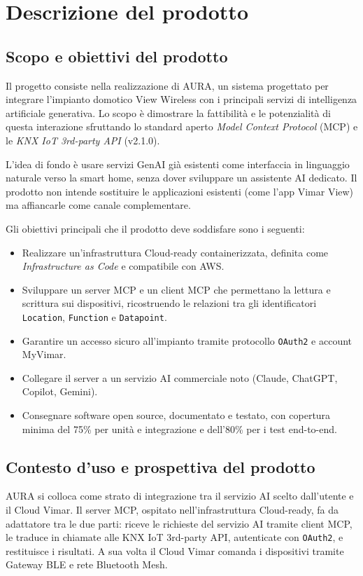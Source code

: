 \documentclass[11pt, a4paper]{article}
\newcounter{uc}                            %
\begin{document}
\newpage


\section{Descrizione del prodotto}

\subsection{Scopo e obiettivi del prodotto}
Il progetto consiste nella realizzazione di AURA, un sistema progettato per integrare l'impianto domotico View Wireless con i principali servizi di intelligenza artificiale generativa. Lo scopo è dimostrare la fattibilità e le potenzialità di questa interazione sfruttando lo standard aperto \emph{Model Context Protocol} (MCP) e le \emph{KNX IoT 3rd-party API} (v2.1.0). 

\noindent L'idea di fondo è usare servizi GenAI già esistenti come interfaccia in linguaggio naturale verso la smart home, senza dover sviluppare un assistente AI dedicato. Il prodotto non intende sostituire le applicazioni esistenti (come l'app Vimar View) ma affiancarle come canale complementare.

\noindent Gli obiettivi principali che il prodotto deve soddisfare sono i seguenti:
\begin{itemize}
    \item Realizzare un'infrastruttura Cloud-ready containerizzata, definita come \emph{Infrastructure as Code} e compatibile con AWS.
    \item Sviluppare un server MCP e un client MCP che permettano la lettura e scrittura sui dispositivi, ricostruendo le relazioni tra gli identificatori \texttt{Location}, \texttt{Function} e \texttt{Datapoint}.
    \item Garantire un accesso sicuro all'impianto tramite protocollo \texttt{OAuth2} e account MyVimar.
    \item Collegare il server a un servizio AI commerciale noto (Claude, ChatGPT, Copilot, Gemini).
    \item Consegnare software open source, documentato e testato, con copertura minima del 75\% per unità e integrazione e dell'80\% per i test end-to-end.
\end{itemize}

\subsection{Contesto d'uso e prospettiva del prodotto}
AURA si colloca come strato di integrazione tra il servizio AI scelto dall'utente e il Cloud Vimar. Il server MCP, ospitato nell'infrastruttura Cloud-ready, fa da adattatore tra le due parti: riceve le richieste del servizio AI tramite client MCP, le traduce in chiamate alle KNX IoT 3rd-party API, autenticate con \texttt{OAuth2}, e restituisce i risultati. A sua volta il Cloud Vimar comanda i dispositivi tramite Gateway BLE e rete Bluetooth Mesh. 
\end{document}
